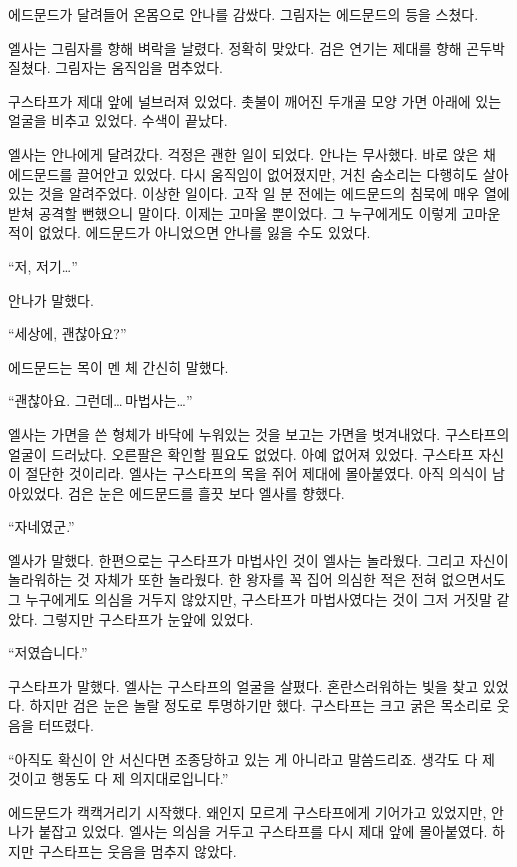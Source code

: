 에드문드가 달려들어 온몸으로 안나를 감쌌다. 그림자는 에드문드의 등을 스쳤다.

엘사는 그림자를 향해 벼락을 날렸다. 정확히 맞았다. 검은 연기는 제대를 향해 곤두박질쳤다. 그림자는 움직임을 멈추었다.

구스타프가 제대 앞에 널브러져 있었다. 촛불이 깨어진 두개골 모양 가면 아래에 있는 얼굴을 비추고 있었다. 수색이 끝났다.

\textbreak

엘사는 안나에게 달려갔다. 걱정은 괜한 일이 되었다. 안나는 무사했다. 바로 앉은 채 에드문드를 끌어안고 있었다. 다시 움직임이 없어졌지만, 거친 숨소리는 다행히도 살아있는 것을 알려주었다. 이상한 일이다. 고작 일 분 전에는 에드문드의 침묵에 매우 열에 받쳐 공격할 뻔했으니 말이다. 이제는 고마울 뿐이었다. 그 누구에게도 이렇게 고마운 적이 없었다. 에드문드가 아니었으면 안나를 잃을 수도 있었다.

``저, 저기\ldots''

안나가 말했다.

``세상에, 괜찮아요?''

에드문드는 목이 멘 체 간신히 말했다.

``괜찮아요. 그런데\ldots\,마법사는\ldots''

엘사는 가면을 쓴 형체가 바닥에 누워있는 것을 보고는 가면을 벗겨내었다. 구스타프의 얼굴이 드러났다. 오른팔은 확인할 필요도 없었다. 아예 없어져 있었다. 구스타프 자신이 절단한 것이리라. 엘사는 구스타프의 목을 쥐어 제대에 몰아붙였다. 아직 의식이 남아있었다. 검은 눈은 에드문드를 흘끗 보다 엘사를 향했다.

``자네였군.''

엘사가 말했다. 한편으로는 구스타프가 마법사인 것이 엘사는 놀라웠다. 그리고 자신이 놀라워하는 것 자체가 또한 놀라웠다. 한 왕자를 꼭 집어 의심한 적은 전혀 없으면서도 그 누구에게도 의심을 거두지 않았지만, 구스타프가 마법사였다는 것이 그저 거짓말 같았다. 그렇지만 구스타프가 눈앞에 있었다.

``저였습니다.''

구스타프가 말했다. 엘사는 구스타프의 얼굴을 살폈다. 혼란스러워하는 빛을 찾고 있었다. 하지만 검은 눈은 놀랄 정도로 투명하기만 했다. 구스타프는 크고 굵은 목소리로 웃음을 터뜨렸다.

``아직도 확신이 안 서신다면 조종당하고 있는 게 아니라고 말씀드리죠. 생각도 다 제 것이고 행동도 다 제 의지대로입니다.''

에드문드가 캑캑거리기 시작했다. 왜인지 모르게 구스타프에게 기어가고 있었지만, 안나가 붙잡고 있었다. 엘사는 의심을 거두고 구스타프를 다시 제대 앞에 몰아붙였다. 하지만 구스타프는 웃음을 멈추지 않았다.

